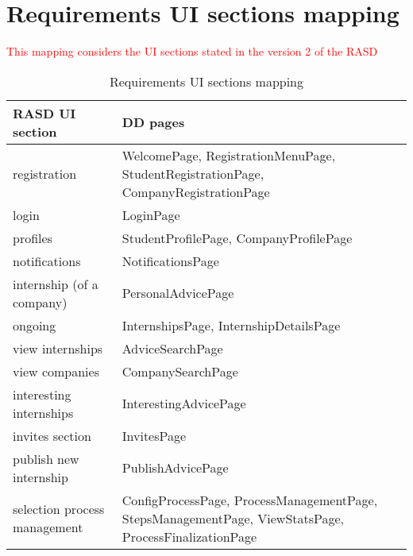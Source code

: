 	\section{Requirements UI sections mapping}
		\textcolor{red}{This mapping considers the UI sections stated in the version 2 of the RASD}
		\begin{table}[H]
			\begin{tabular}{ | m{6cm} | m{6cm} | } 
				\hline
					\textbf {RASD UI section} & \textbf{DD pages} \\
				\hline
					registration & WelcomePage, RegistrationMenuPage, StudentRegistrationPage, CompanyRegistrationPage\\
				\hline
					login & LoginPage\\
				\hline
					profiles & StudentProfilePage, CompanyProfilePage \\
				\hline
					notifications & NotificationsPage\\
				\hline
					internship (of a company) & PersonalAdvicePage\\
				\hline
					ongoing & InternshipsPage, InternshipDetailsPage\\
				\hline
					view internships & AdviceSearchPage\\
				\hline
					view companies & CompanySearchPage\\
				\hline
					interesting internships & InterestingAdvicePage\\
				\hline
					invites section & InvitesPage\\
				\hline
					publish new internship & PublishAdvicePage\\
				\hline
					selection process management & ConfigProcessPage, ProcessManagementPage, StepsManagementPage, ViewStatsPage, ProcessFinalizationPage \\
				\hline
			\end{tabular}
			\caption{Requirements UI sections mapping}
		\end{table}